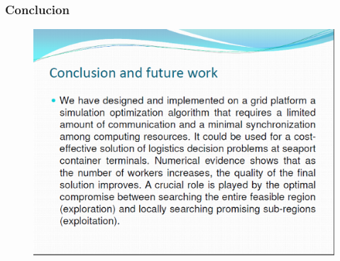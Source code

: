 \documentclass{beamer}
\begin{document}
\begin{frame}
\frametitle{Conclucion }
\begin{figure}[!th]
\begin{center}
\includegraphics[width=1\textwidth]{img/pic15.eps}
\end{center}
\end{figure}
\end{frame}
\end{document}
